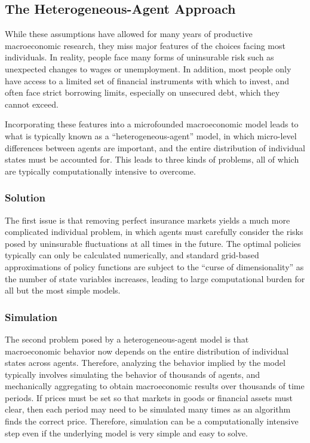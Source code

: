 \documentclass[a4paper,12pt]{article}
\numberwithin{equation}{section}
\theoremstyle{definition}
\begin{document}
\subsection{The Heterogeneous-Agent Approach}

While these assumptions have allowed for many years of productive
macroeconomic research, they miss major features of the choices facing
most individuals. In reality, people face many forms of uninsurable
risk such as unexpected changes to wages or unemployment. In addition,
most people only have access to a limited set of financial instruments
with which to invest, and often face strict borrowing limits,
especially on unsecured debt, which they cannot exceed.

Incorporating these features into a microfounded macroeconomic model
leads to what is typically known as a ``heterogeneous-agent'' model,
in which micro-level differences between agents are important, and the
entire distribution of individual states must be accounted for. This
leads to three kinds of problems, all of which are typically
computationally intensive to overcome. 

\subsubsection{Solution}

The first issue is that removing perfect insurance markets yields a
much more complicated individual problem, in which agents must
carefully consider the risks posed by uninsurable fluctuations at all
times in the future. The optimal policies typically can only be
calculated numerically, and standard grid-based approximations of
policy functions are subject to the ``curse of dimensionality'' as the
number of state variables increases, leading to large computational
burden for all but the most simple models.

\subsubsection{Simulation}

The second problem posed by a heterogeneous-agent model is that
macroeconomic behavior now depends on the entire distribution of
individual states across agents. Therefore, analyzing the behavior
implied by the model typically involves simulating the behavior of
thousands of agents, and mechanically aggregating to obtain
macroeconomic results over thousands of time periods. If prices must
be set so that markets in goods or financial assets must clear, then
each period may need to be simulated many times as an algorithm finds
the correct price. Therefore, simulation can be a computationally
intensive step even if the underlying model is very simple and easy to
solve.
\end{document}
